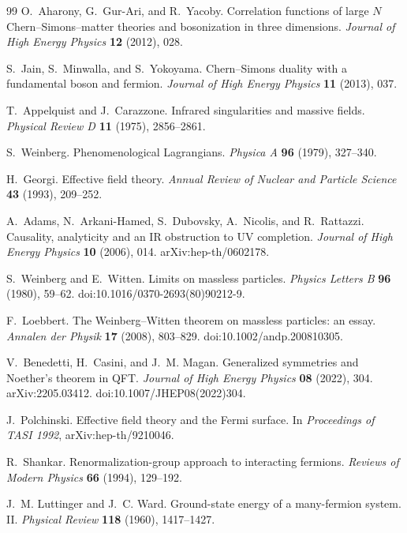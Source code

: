 \begin{thebibliography}{99}
O.~Aharony, G.~Gur-Ari, and R.~Yacoby.
Correlation functions of large \(N\) Chern--Simons--matter theories and
bosonization in three dimensions.
\emph{Journal of High Energy Physics} \textbf{12} (2012), 028.

S.~Jain, S.~Minwalla, and S.~Yokoyama.
Chern--Simons duality with a fundamental boson and fermion.
\emph{Journal of High Energy Physics} \textbf{11} (2013), 037.

T.~Appelquist and J.~Carazzone.
Infrared singularities and massive fields.
\emph{Physical Review D} \textbf{11} (1975), 2856--2861.

S.~Weinberg.
Phenomenological Lagrangians.
\emph{Physica A} \textbf{96} (1979), 327--340.

H.~Georgi.
Effective field theory.
\emph{Annual Review of Nuclear and Particle Science} \textbf{43} (1993),
209--252.

A.~Adams, N.~Arkani-Hamed, S.~Dubovsky, A.~Nicolis, and R.~Rattazzi.
Causality, analyticity and an IR obstruction to UV completion.
\emph{Journal of High Energy Physics} \textbf{10} (2006), 014.
arXiv:hep-th/0602178.

S.~Weinberg and E.~Witten.
Limits on massless particles.
\emph{Physics Letters B} \textbf{96} (1980), 59--62.
doi:10.1016/0370-2693(80)90212-9.

F.~Loebbert.
The Weinberg--Witten theorem on massless particles: an essay.
\emph{Annalen der Physik} \textbf{17} (2008), 803--829.
doi:10.1002/andp.200810305.

V.~Benedetti, H.~Casini, and J.~M. Magan.
Generalized symmetries and Noether's theorem in QFT.
\emph{Journal of High Energy Physics} \textbf{08} (2022), 304.
arXiv:2205.03412.
doi:10.1007/JHEP08(2022)304.

J.~Polchinski.
Effective field theory and the Fermi surface.
In \emph{Proceedings of TASI 1992}, arXiv:hep-th/9210046.

R.~Shankar.
Renormalization-group approach to interacting fermions.
\emph{Reviews of Modern Physics} \textbf{66} (1994), 129--192.

J.~M. Luttinger and J.~C. Ward.
Ground-state energy of a many-fermion system. II.
\emph{Physical Review} \textbf{118} (1960), 1417--1427.


\end{thebibliography}
